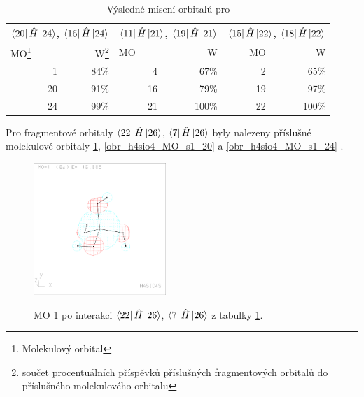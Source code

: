 \documentclass[
  digital, %
  table,   %
  lof,     %
  lot,     %
]{fithesis3}
\begin{document}
\begin{table}[htbp]
\begin{minipage}{\textwidth}
\caption{Výsledné mísení orbitalů pro }
\begin{center}
\begin{tabular}{|r|r|r|r|r|r|}
\hline 
\multicolumn{2}{|c|}{$\bra{20}{\hat{H}}\ket{24}$, $\bra{16}{\hat{H}}\ket{24}$} & \multicolumn{2}{|c|}{$\bra{11}{\hat{H}}\ket{21}$, $\bra{19}{\hat{H}}\ket{21}$}& \multicolumn{2}{|c|}{$\bra{15}{\hat{H}}\ket{22}$, $\bra{18}{\hat{H}}\ket{22}$} \\
\hline \hline
\multicolumn{1}{|l|}{MO\footnote{Molekulový orbital} } & \multicolumn{1}{r|}{W\footnote{součet procentuálních příspěvků příslušných fragmentových orbitalů do příslušného molekulového orbitalu}} & \multicolumn{1}{l|}{MO} & \multicolumn{1}{r|}{W} & MO & \multicolumn{1}{r|}{W} \\ \hline
1 & 84\% & 4 & 67\% & 2 & 65\% \\ \hline
20 & 91\% & 16 & 79\% & 19 & 97\% \\ \hline
24 & 99\% & 21 & 100\% &  22& 100\% \\ \hline
\end{tabular}
\end{center}
\label{tab_h4sio4_vysledky}
\end{minipage}
\end{table}

    Pro fragmentové orbitaly $\bra{22}{\hat{H}}\ket{26}$, $\bra{7}{\hat{H}}\ket{26}$ byly nalezeny příslušné molekulové orbitaly \ref{obr_h4sio4_MO_s1_1}, \ref{obr_h4sio4_MO_s1_20} a \ref{obr_h4sio4_MO_s1_24} .
  
  \begin{figure}[h]
\caption{MO 1 po interakci $\bra{22}{\hat{H}}\ket{26}$, $\bra{7}{\hat{H}}\ket{26}$ z tabulky \ref{tab_h4sio4_vysledky}.  }
  \center
  \includegraphics[width=5cm]{h4sio4_obrazky/s1_1.eps}
  \label{obr_h4sio4_MO_s1_1}
  \end{figure}
\end{document}
